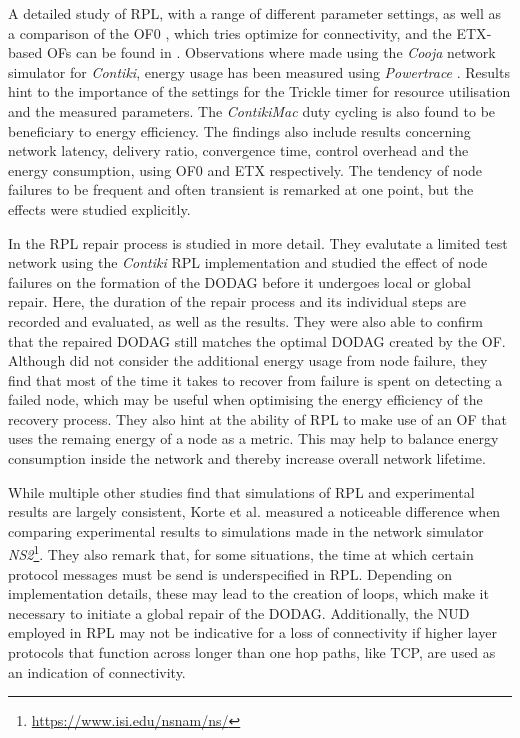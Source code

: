 A detailed study of \ac{RPL}, with a range of different parameter settings, as well as a comparison of the OF0 \cite{rfc6552}, which tries optimize for connectivity, and the \ac{ETX}-based \acp{OF} can be found in \cite{ali2012performance}.
Observations where made using the \emph{Cooja} \cite{osterlind2006cross} network simulator for \emph{Contiki}, energy usage has been measured using \emph{Powertrace} \cite{dunkels2011powertrace}.
Results hint to the importance of the settings for the Trickle timer for resource utilisation and the measured parameters.
The \emph{ContikiMac} \cite{dunkels2011contikimac} duty cycling is also found to be beneficiary to energy efficiency.
The findings also include results concerning network latency, delivery ratio, convergence time, control overhead and the energy consumption, using OF0 and \ac{ETX} respectively.
The tendency of node failures to be frequent and often transient is remarked at one point, but the effects were studied explicitly.

In \cite{korte2012study} the \ac{RPL} repair process is studied in more detail.
They evalutate a limited test network using the \emph{Contiki} \ac{RPL} implementation and studied the effect of node failures on the formation of the \ac{DODAG} before it undergoes local or global repair.
Here, the duration of the repair process and its individual steps are recorded and evaluated, as well as the results.
They were also able to confirm that the repaired \ac{DODAG} still matches the optimal \ac{DODAG} created by the \ac{OF}.
Although \cite{korte2012study} did not consider the additional energy usage from node failure, they find that most of the time it takes to recover from failure is spent on detecting a failed node, which may be useful when optimising the energy efficiency of the recovery process.
They also hint at the ability of \ac{RPL} to make use of an \ac{OF} that uses the remaing energy of a node as a metric.
This may help to balance energy consumption inside the network and thereby increase overall network lifetime.

While multiple other studies find that simulations of \ac{RPL} and experimental
results are largely consistent, Korte et al. \cite{korte2012study} measured a noticeable difference when comparing experimental results to simulations made in the network simulator \emph{NS2}\footnote{\url{https://www.isi.edu/nsnam/ns/}}.
They also remark that, for some situations, the time at which certain protocol messages must be send is underspecified in \ac{RPL}.
Depending on implementation details, these may lead to the creation of loops, which make it necessary to initiate a global repair of the \ac{DODAG}.
Additionally, the \ac{NUD} employed in \ac{RPL} may not be indicative for a loss of connectivity if higher layer protocols that function across longer than one hop paths, like \ac{TCP}, are used as an indication of connectivity.

